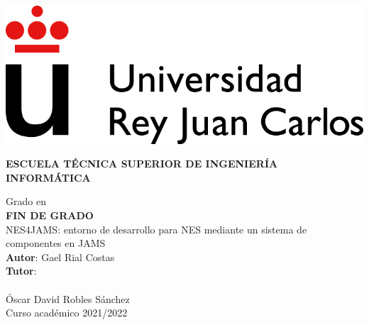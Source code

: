 \thispagestyle{empty}

\includegraphics{images/URJC_logo}
\vspace{2cm}

\begin{center}
	\large{\textbf{ESCUELA TÉCNICA SUPERIOR DE INGENIERÍA INFORMÁTICA}}
	\vspace{5mm}

 	{\Large {Grado en }}
    \\
  	\vspace{34mm}
	{\large {\bf {} FIN DE GRADO}}
  	\vspace{10mm}
    \\
  	{\Large {{\Huge {
		NES4JAMS: entorno de desarrollo para NES mediante un sistema de componentes en JAMS
	}} \\[1cm] }}
  	\vspace{2cm}
	{\large {
        \textbf{Autor}: Gael Rial Costas\\
        \textbf{Tutor}:\\
        \\
        Óscar David Robles Sánchez\\
  	}}
	\vspace{10mm}
  	{\large {Curso académico 2021/2022}}
  	\vspace{1cm}
\end{center}
